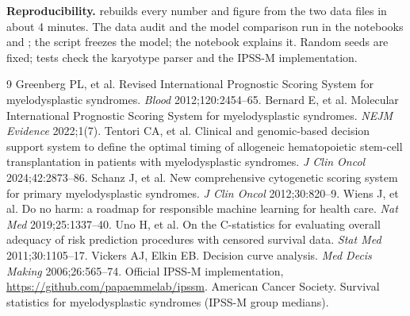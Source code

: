 \documentclass[11pt,a4paper]{article}
\begin{document}
\textbf{Reproducibility.}  rebuilds every number and figure from the two data files in about 4 minutes. The data audit and the model comparison run in the notebooks  and ; the script  freezes the model; the notebook  explains it. Random seeds are fixed; tests check the karyotype parser and the IPSS-M implementation.

{\small
\begin{thebibliography}{9}\setlength{\itemsep}{0pt}
 Greenberg PL, et al. Revised International Prognostic Scoring System for myelodysplastic syndromes. \emph{Blood} 2012;120:2454--65.
 Bernard E, et al. Molecular International Prognostic Scoring System for myelodysplastic syndromes. \emph{NEJM Evidence} 2022;1(7).
 Tentori CA, et al. Clinical and genomic-based decision support system to define the optimal timing of allogeneic hematopoietic stem-cell transplantation in patients with myelodysplastic syndromes. \emph{J Clin Oncol} 2024;42:2873--86.
 Schanz J, et al. New comprehensive cytogenetic scoring system for primary myelodysplastic syndromes. \emph{J Clin Oncol} 2012;30:820--9.
 Wiens J, et al. Do no harm: a roadmap for responsible machine learning for health care. \emph{Nat Med} 2019;25:1337--40.
 Uno H, et al. On the C-statistics for evaluating overall adequacy of risk prediction procedures with censored survival data. \emph{Stat Med} 2011;30:1105--17.
 Vickers AJ, Elkin EB. Decision curve analysis. \emph{Med Decis Making} 2006;26:565--74.
 Official IPSS-M implementation, \url{https://github.com/papaemmelab/ipssm}.
 American Cancer Society. Survival statistics for myelodysplastic syndromes (IPSS-M group medians).
\end{thebibliography}}
\end{document}
